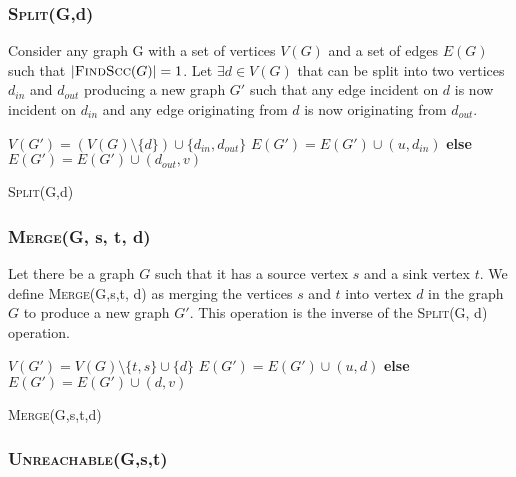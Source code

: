 \subsubsection{\textsc{Split}(G,d)}\label{Subsubsec: Split}
Consider any graph G with a set of vertices $V(G)$ and a set of edges $E(G)$ such that $|\text{\textsc{FindScc}}(G)| = 1$.
Let $\exists d \in V(G)$ that can be split into two vertices $d_{in}$ and $d_{out}$ producing a new graph $G'$ 
such that any edge incident on $d$ is now incident on $d_{in}$ and any edge originating from $d$ is now originating from $d_{out}$.

\begin{algorithm}[H]
    \SetAlgoLined
    $V(G') = (V(G) \setminus \{d\}) \cup \{d_{in}, d_{out}\}$\;
     {
         {
            $E(G') = E(G') \cup (u, d_{in})$
        }
        \textbf{else}  {
            $E(G') = E(G') \cup (d_{out}, v)$
        }
    }
    \caption{\textsc{Split}(G,d)}
\end{algorithm}

\subsubsection{\textsc{Merge}(G, s, t, d)}\label{Subsubsec: Merge}
Let there be a graph $G$ such that it has a source vertex $s$ and a sink vertex $t$.
We define \textsc{Merge}(G,s,t, d) as merging the vertices $s$ and $t$ into vertex $d$ in the graph $G$ to produce a new graph $G'$.
This operation is the inverse of the \textsc{Split}(G, d) operation.

\begin{algorithm}[H]
    \SetAlgoLined
    $V(G') = V(G) \setminus \{t, s\} \cup \{d\}$\;
     {
         {
            $E(G') = E(G') \cup (u, d)$
        }
        \textbf{else}  {
            $E(G') = E(G') \cup (d, v)$
        }
    }
    \caption{\textsc{Merge}(G,s,t,d)}
\end{algorithm}

\subsubsection{\textsc{Unreachable}(G,s,t)}\label{Subsubsec: Unreachable}

